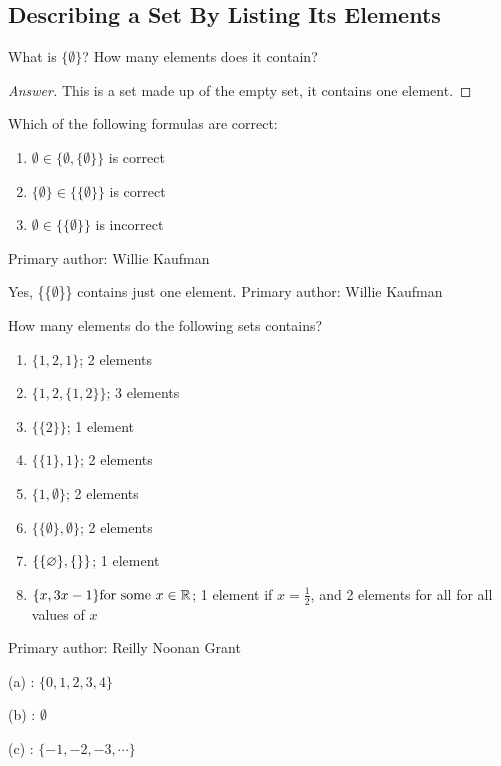 \subsection{Describing a Set By Listing Its Elements}%
				\begin{minorEx}%
					What is $ \{\emptyset\} $? How many elements does it contain?
				\end{minorEx}
				\begin{proof}[Answer]
					This is a set made up of the empty set, it contains one element.
				\end{proof}
				\begin{minorEx}%
                Which of the following formulas are correct:
				\begin{enumerate}
                \item $\emptyset \in \{\emptyset, \{\emptyset\}\}$ is correct
                \item $\{\emptyset\} \in \{\{\emptyset\}\}$ is correct
                \item $\emptyset \in \{\{\emptyset\}\}$ is incorrect
                \end{enumerate}
                Primary author: Willie Kaufman
				\end{minorEx}
				\begin{minorEx}%
					Yes, \{\{$\emptyset$\}\} contains just one element. \newline
                    Primary author: Willie Kaufman
				\end{minorEx}
				\begin{minorEx}%
					How many elements do the following sets contains?
				\end{minorEx}
                \begin{enumerate}
					\item $\{1,2,1 \}$; 2 elements
					\item $\{ 1,2,\{1,2\} \}$; 3 elements
					\item $\{\{ 2 \} \}$; 1 element
					\item $\{ \{1 \}, 1\}$; 2 elements
					\item $\{ 1, \emptyset \}$; 2 elements
					\item $\{ \{ \emptyset \}, \emptyset \}$; 2 elements
					\item $\{ \{ \emptyset\}, \{\null\} \}$; 1 element
					\item $\{x, 3x-1 \} \text{for some } x\in \mathbb{R}$; 1 element if $x = \frac{1}{2}$, and 2 elements for all for all values of $x$
                \end{enumerate}
                Primary author: Reilly Noonan Grant
                \begin{minorEx}
                (a) : $\{0, 1, 2, 3, 4\}$
                
                (b) : $\emptyset$
                
                (c) : $\{-1, -2, -3, \cdots\}$
                \end{minorEx}
